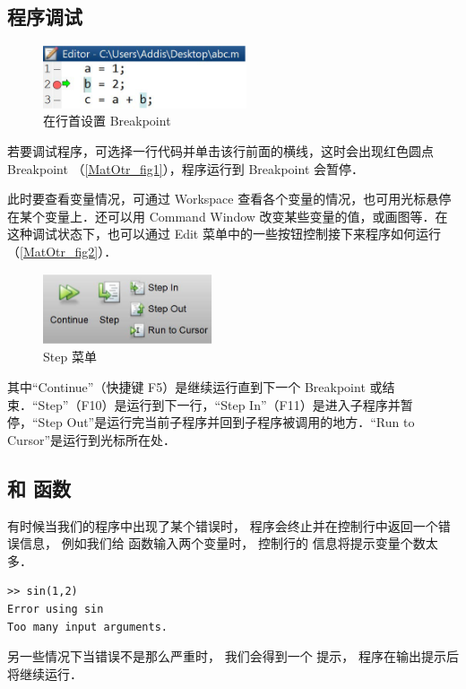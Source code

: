 

\subsection{程序调试}
\begin{figure}[ht]
\centering
\includegraphics[width= 6cm]{./figures/MatOtr1.png}
\caption{在行首设置 Breakpoint}\label{MatOtr_fig1}
\end{figure}

若要调试程序，可选择一行代码并单击该行前面的横线，这时会出现红色圆点 Breakpoint （\autoref{MatOtr_fig1}），程序运行到 Breakpoint 会暂停．

此时要查看变量情况，可通过 Workspace 查看各个变量的情况，也可用光标悬停在某个变量上．还可以用 Command Window 改变某些变量的值，或画图等．在这种调试状态下，也可以通过 Edit 菜单中的一些按钮控制接下来程序如何运行（\autoref{MatOtr_fig2}）．
\begin{figure}[ht]
\centering
\includegraphics[width= 5cm]{./figures/MatOtr2.png}
\caption{Step 菜单}\label{MatOtr_fig2}
\end{figure}
其中“Continue”（快捷键 F5）是继续运行直到下一个 Breakpoint 或结束．“Step”（F10）是运行到下一行，“Step In”（F11）是进入子程序并暂停，“Step Out”是运行完当前子程序并回到子程序被调用的地方．“Run to Cursor”是运行到光标所在处．

\subsection{ 和  函数}
有时候当我们的程序中出现了某个错误时， 程序会终止并在控制行中返回一个错误信息， 例如我们给  函数输入两个变量时， 控制行的  信息将提示变量个数太多．
\begin{lstlisting}[language=MatlabCom]
>> sin(1,2)
Error using sin
Too many input arguments.
\end{lstlisting}
另一些情况下当错误不是那么严重时， 我们会得到一个  提示， 程序在输出提示后将继续运行．

